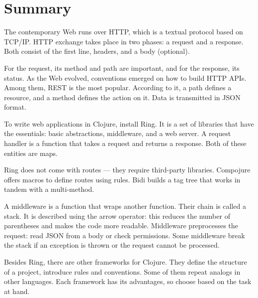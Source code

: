 \section{Summary}

The contemporary Web runs over HTTP, which is a textual protocol based on TCP/IP. HTTP exchange takes place in two phases: a request and a response. Both consist of the first line, headers, and a body (optional).

For the request, its method and path are important, and for the response, its status. As the Web evolved, conventions emerged on how to build HTTP APIs. Among them, REST is the most popular. According to it, a path defines a resource, and a method defines the action on it. Data is transmitted in JSON format.

To write web applications in Clojure, install Ring. It is a set of libraries that have the essentials: basic abstractions, middleware, and a web server. A request handler is a function that takes a request and returns a response. Both of these entities are maps.

Ring does not come with routes — they require third-party libraries. Compojure offers macros to define routes using rules. Bidi builds a tag tree that works in tandem with a multi-method.

A middleware is a function that wraps another function. Their chain is called a stack. It is described using the arrow operator: this reduces the number of parentheses and makes the code more readable. Middleware preprocesses the request: read JSON from a body or check permissions. Some middleware break the stack if an exception is thrown or the request cannot be processed.

Besides Ring, there are other frameworks for Clojure. They define the structure of a project, introduce rules and conventions. Some of them repeat analogs in other languages. Each framework has its advantages, so choose based on the task at hand.
